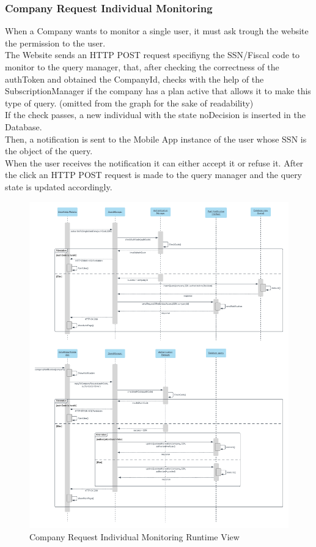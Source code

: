 \subsubsection{Company Request Individual Monitoring}
When a Company wants to monitor a single user, it must ask trough the website the permission to the user.\\
The Website sends an HTTP POST request specifiyng the SSN/Fiscal code to monitor to the query manager, that, after checking the correctness of the authToken and obtained the CompanyId, checks with the help of the SubscriptionManager if the company has a plan active that allows it to make this type of query. (omitted from the graph for the sake of readability)\\
If the check passes, a new individual with the state noDecision is inserted in the Database.\\
Then, a notification is sent to the Mobile App instance of the user whose SSN is the object of the query.\\
When the user receives the notification it can either accept it or refuse it. After the click an HTTP POST request is made to the query manager and the query state is updated accordingly.

\begin{figure}[H]
	\includegraphics[width=\textwidth,height=\textheight,keepaspectratio]{assets/flowCharts/CompanyRequestIndividualMonitoring.pdf}
	\caption{Company Request Individual Monitoring Runtime View}
	\label{fig:CompanyRequestIndividualMonitoring}
\end{figure}

